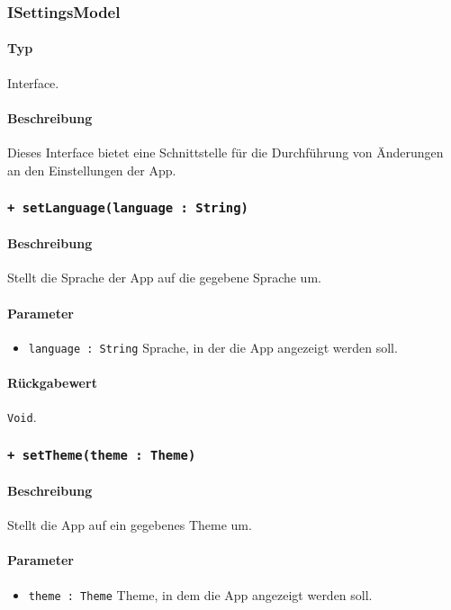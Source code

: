 \subsubsection{ISettingsModel}
\paragraph*{Typ}
Interface.
\paragraph*{Beschreibung}
Dieses Interface bietet eine Schnittstelle für die Durchführung von Änderungen an den Einstellungen der App.

\subsubsection*{\texttt{+ setLanguage(language : String)}}%
\paragraph*{Beschreibung}
Stellt die Sprache der App auf die gegebene Sprache um.
\paragraph*{Parameter}
\begin{itemize}
    \item \texttt{language : String} Sprache, in der die App angezeigt werden soll.
\end{itemize}
\paragraph*{Rückgabewert}
\texttt{Void}.

\subsubsection*{\texttt{+ setTheme(theme : Theme)}}%
\paragraph*{Beschreibung}
Stellt die App auf ein gegebenes Theme um.
\paragraph*{Parameter}
\begin{itemize}
    \item \texttt{theme : Theme} Theme, in dem die App angezeigt werden soll.
\end{itemize}
